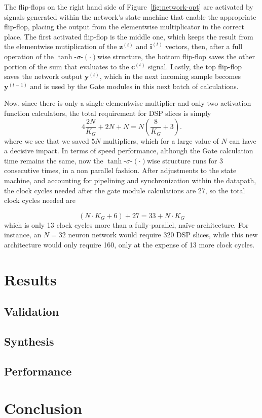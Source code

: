 \documentclass{IEEEtran}
\newcommand{\mb}[1]{\mathbf{#1}}
\begin{document}
The flip-flops on the right hand side of Figure~\ref{fig:network-opt} are activated by signals generated within the network's state machine that enable the appropriate flip-flop, placing the output from the elementwise multiplicator in the correct place. The first activated flip-flop is the middle one, which keeps the result from the elementwise mutiplication of the $\mb{z}^{(t)}$ and $\mb{i}^{(t)}$ vectors, then, after a full operation of the $\tanh$-$\sigma$-$(\cdot)$wise structure, the bottom flip-flop saves the other portion of the sum that evaluates to the $\mb{c}^{(t)}$ signal. Lastly, the top flip-flop saves the network output $\mb{y}^{(t)}$, which in the next incoming sample becomes $\mb{y}^{(t-1)}$ and is used by the Gate modules in this next batch of calculations.

Now, since there is only a single elementwise multiplier and only two activation function calculators, the total requirement for DSP slices is simply
\begin{equation}\label{eq:numdsp_network-opt}
    4\frac{2N}{K_G} + 2N + N = N \left( \frac{8}{K_G} + 3 \right).
\end{equation}
where we see that we saved $5N$ multipliers, which for a large value of $N$ can have a decisive impact. In terms of speed performance, although the Gate calculation time remains the same, now the $\tanh$-$\sigma$-$(\cdot)$wise structure runs for 3 consecutive times, in a non parallel fashion. After adjustments to the state machine, and accounting for pipelining and synchronization within the datapath, the clock cycles needed after the gate module calculations are 27, so the total clock cycles needed are 

\begin{equation}\label{eq:numcc_network-opt}
    (N \cdot K_G + 6) + 27  = 33 + N\cdot K_G
\end{equation}
which is only 13 clock cycles more than a fully-parallel, naïve architecture. For instance, an $N=32$ neuron network would require 320 DSP slices, while this new architecture would only require 160, only at the expense of 13 more clock cycles.

\section{Results}\label{sec:results}

\subsection{Validation}

\subsection{Synthesis}

\subsection{Performance}

\section{Conclusion}\label{sec:concl}

  
 
\end{document}

